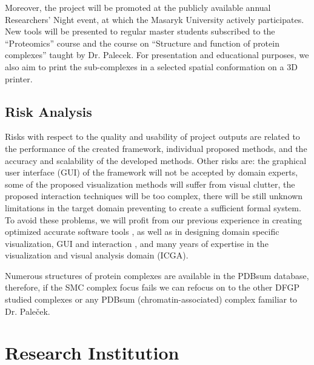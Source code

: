 \documentclass[11pt,a4paper,titlepage,oneside,onecolumn]{article}
\begin{document}

Moreover, the project will be promoted at the publicly available annual Researchers' Night event, at which the Masaryk University actively participates. New tools will be presented to regular master students subscribed to the “Proteomics” course and the course on “Structure and function of protein complexes” taught by Dr. Palecek. For presentation and educational purposes, we also aim to print the sub-complexes in a selected spatial conformation on a 3D printer. 

\subsection{Risk Analysis}
Risks with respect to the quality and usability of project outputs are related to the performance of the created framework,  individual proposed methods, and the accuracy and scalability of the developed methods. Other risks are: the graphical user interface (GUI) of the framework will not be accepted by domain experts, some of the proposed visualization methods will suffer from visual clutter, the proposed interaction techniques will be too complex, there will be still unknown limitations in the target domain preventing to create a sufficient formal system.
To avoid these problems, we will profit from our previous experience in creating optimized accurate software tools \cite{caver}, as well as in designing domain specific visualization, GUI and interaction \cite{analyst}, and many years of expertise in the visualization and visual analysis domain (ICGA). 

Numerous structures of protein complexes are available in the PDBsum database, therefore, if the SMC complex focus fails we can refocus on to the other DFGP studied complexes or any PDBsum (chromatin-associated) complex familiar to Dr. Pale\v{c}ek. 
\section{Research Institution}
\label{sec:ResearchInstitution}
\end{document}
